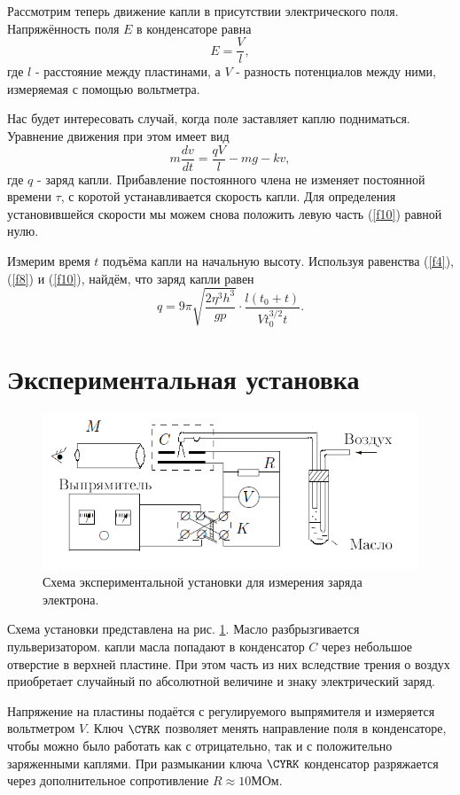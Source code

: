 \documentclass[a4paper, 12pt, twoside]{article}
\begin{document}
Рассмотрим теперь движение капли в присутствии электрического поля. Напряжённость поля $E$ в конденсаторе равна
\begin{equation}
\label{f9}
E = \dfrac{V}{l},
\end{equation}
где $l$ - расстояние между пластинами, а $V$ - разность потенциалов между ними, измеряемая с помощью вольтметра.

Нас будет интересовать случай, когда поле заставляет каплю подниматься. Уравнение движения при этом имеет вид
\begin{equation}
\label{f10}
m\dfrac{dv}{dt} = \dfrac{qV}{l} - mg - kv,
\end{equation}
где $q$ - заряд капли. Прибавление постоянного члена не изменяет постоянной времени $\tau$, с коротой устанавливается скорость капли. Для определения установившейся скорости мы можем снова положить левую часть (\ref{f10}) равной нулю.

Измерим время $t$ подъёма капли на начальную высоту. Используя равенства (\ref{f4}), (\ref{f8}) и (\ref{f10}), найдём, что заряд капли равен
\begin{equation}
\label{f11}
q = 9\pi \sqrt{\dfrac{2\eta^{3}h^{3}}{gp}}\cdot \dfrac{l(t_{0} + t)}{V t_{0}^{3/2}t}.
\end{equation}
\newpage
\section{Экспериментальная установка}

\begin{figure}[H]
	\centering
	\includegraphics[width = 0.6 \textwidth]{ust}
	\caption{Схема экспериментальной установки для измерения заряда электрона.}
	\label{ust}
\end{figure}

Схема установки представлена на рис. \ref{ust}. Масло разбрызгивается пульверизатором. капли масла попадают в конденсатор $C$ через небольшое отверстие в верхней пластине. При этом часть из них вследствие трения о воздух приобретает случайный по абсолютной величине и знаку электрический заряд.

Напряжение на пластины подаётся с регулируемого выпрямителя и измеряется вольтметром $V$. Ключ $\CYRK$ позволяет менять направление поля в конденсаторе, чтобы можно было работать как с отрицательно, так и с положительно заряженными каплями. При размыкании ключа $\CYRK$ конденсатор разряжается через дополнительное сопротивление  $R \approx 10\text{МОм.}$
\end{document}
